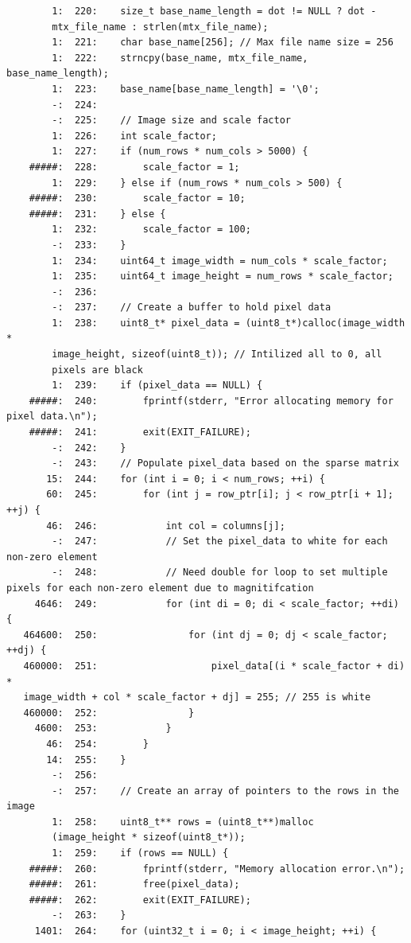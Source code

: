 \documentclass[12pt]{article}
\begin{document}
\begin{mdframed}[style=myboxstyleTerminal1]
\begin{verbatim}
        1:  220:    size_t base_name_length = dot != NULL ? dot - 
        mtx_file_name : strlen(mtx_file_name);
        1:  221:    char base_name[256]; // Max file name size = 256
        1:  222:    strncpy(base_name, mtx_file_name, base_name_length); 
        1:  223:    base_name[base_name_length] = '\0';
        -:  224:    
        -:  225:    // Image size and scale factor
        1:  226:    int scale_factor;
        1:  227:    if (num_rows * num_cols > 5000) {
    #####:  228:        scale_factor = 1;
        1:  229:    } else if (num_rows * num_cols > 500) {
    #####:  230:        scale_factor = 10;
    #####:  231:    } else {
        1:  232:        scale_factor = 100;
        -:  233:    }
        1:  234:    uint64_t image_width = num_cols * scale_factor;
        1:  235:    uint64_t image_height = num_rows * scale_factor;
        -:  236:
        -:  237:    // Create a buffer to hold pixel data
        1:  238:    uint8_t* pixel_data = (uint8_t*)calloc(image_width * 
        image_height, sizeof(uint8_t)); // Intilized all to 0, all 
        pixels are black
        1:  239:    if (pixel_data == NULL) {
    #####:  240:        fprintf(stderr, "Error allocating memory for pixel data.\n");
    #####:  241:        exit(EXIT_FAILURE);
        -:  242:    }
        -:  243:    // Populate pixel_data based on the sparse matrix
       15:  244:    for (int i = 0; i < num_rows; ++i) {
       60:  245:        for (int j = row_ptr[i]; j < row_ptr[i + 1]; ++j) {
       46:  246:            int col = columns[j];
        -:  247:            // Set the pixel_data to white for each non-zero element
        -:  248:            // Need double for loop to set multiple pixels for each non-zero element due to magnitifcation
     4646:  249:            for (int di = 0; di < scale_factor; ++di) {
   464600:  250:                for (int dj = 0; dj < scale_factor; ++dj) {
   460000:  251:                    pixel_data[(i * scale_factor + di) *
   image_width + col * scale_factor + dj] = 255; // 255 is white
   460000:  252:                }
     4600:  253:            }
       46:  254:        }
       14:  255:    }
        -:  256:
        -:  257:    // Create an array of pointers to the rows in the image
        1:  258:    uint8_t** rows = (uint8_t**)malloc
        (image_height * sizeof(uint8_t*));
        1:  259:    if (rows == NULL) {
    #####:  260:        fprintf(stderr, "Memory allocation error.\n");
    #####:  261:        free(pixel_data);
    #####:  262:        exit(EXIT_FAILURE);
        -:  263:    }
     1401:  264:    for (uint32_t i = 0; i < image_height; ++i) {

\end{verbatim}
\end{mdframed}
\end{document}
